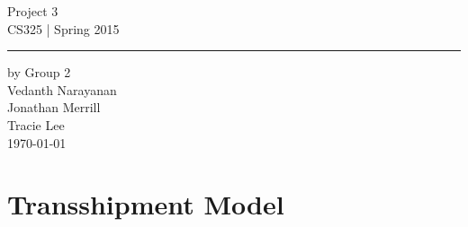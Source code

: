 \documentclass[11pt,letterpaper]{article}
\begin{document}
\begin{titlepage}
    \vspace*{4cm}
    \begin{flushright}
    {\huge
        Project 3\\[5mm]
    }
    {\large
        CS325 | Spring 2015
     }
    \end{flushright}
\hrule
    \begin{flushright}
	by Group 2\\
	Vedanth Narayanan\\
	Jonathan Merrill\\
	Tracie Lee\\
    \vfill
	\today\\
    \end{flushright}
\end{titlepage}

\raggedright

\section{Transshipment Model}
\end{document}
